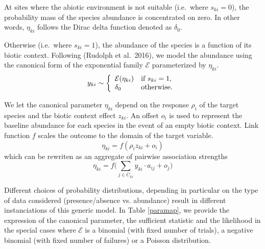 \documentclass[]{article}
\newcommand{\spc}{i}
\newcommand{\ospc}{j}
\newcommand{\site}{k}
\newcommand{\BioCont}{C}
\newcommand{\BioEff}{z}
\newcommand{\abdv}{y}
\newcommand{\ssuit}{s}
\newcommand{\linkf}{f}
\begin{document}
At sites where the abiotic environment is not suitable (i.e.\ where $\ssuit_{\site\spc} = 0$), the probability mass of the species abundance is concentrated on zero. In other words, $\eta_{\site\spc}$ follows the Dirac delta function denoted as $\delta_0$.

Otherwise (i.e.\ where $\ssuit_{\site\spc} = 1$), the abundance of the species is a function of its biotic context. 
Following (Rudolph et al.\ 2016), we model the abundance using the canonical form of the exponential family $\mathcal{E}$ parameterized by $\eta_{\site\spc}$.
\begin{equation*}
\abdv_{\site\spc} \sim \left\{
\begin{array}{ll}
\mathcal{E}(\eta_{\site\spc}) & \mbox{if } \ssuit_{\site\spc}=1, \\
\delta_0 & \mbox{otherwise.}\\
\end{array}
\right. \\
\end{equation*}

We let the canonical parameter $\eta_{\site\spc}$ depend on the response $\rho_\spc$ of the target species and the biotic context effect $\BioEff_{\site\spc}$. An offset $o_{\spc}$ is used to represent the baseline abundance for each species in the event of an empty biotic context. Link function $\linkf$ scales the outcome to the domain of the target variable. 
\begin{equation*}
  \eta_{\site\spc} = \linkf(\rho_\spc \BioEff_{\site\spc} + o_\spc)
\end{equation*}
which can be rewriten as an aggregate of pairwise association strengths
\begin{equation*}
  \eta_{\site\spc} = \linkf\big( \sum_{\ospc \in \BioCont_{\site\spc}} \abdv_{\site\spc} \cdot a_{\spc\ospc} + o_j\big)
\end{equation*}

Different choices of probability distributions, depending in particular on the type of data considered (presence/absence vs. abundance) result in different instanciations of this generic model.
In Table \ref{paramap}, we provide the expression of the canonical parameter, the sufficient statistic and the likelihood in the special cases where $\mathcal{E}$ is a binomial (with fixed number of trials), a negative binomial (with fixed number of failures) or a Poisson distribution. 
\end{document}
